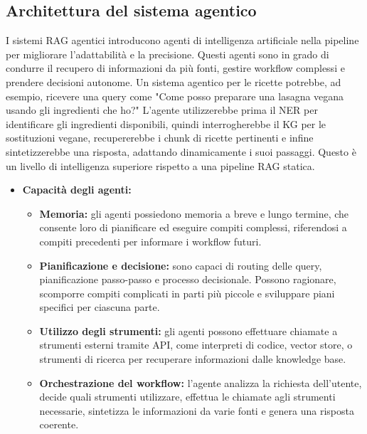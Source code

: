 \documentclass[a4paper, 11pt]{article}
\begin{document}
\subsection{Architettura del sistema agentico}
I sistemi RAG agentici introducono agenti di intelligenza artificiale nella pipeline per migliorare l'adattabilità e la precisione. \cite{what_is_agentic_rag_ibm} Questi agenti sono in grado di condurre il recupero di informazioni da più fonti, gestire workflow complessi e prendere decisioni autonome. Un sistema agentico per le ricette potrebbe, ad esempio, ricevere una query come "Come posso preparare una lasagna vegana usando gli ingredienti che ho?" L'agente utilizzerebbe prima il NER per identificare gli ingredienti disponibili, quindi interrogherebbe il KG per le sostituzioni vegane, recupererebbe i chunk di ricette pertinenti e infine sintetizzerebbe una risposta, adattando dinamicamente i suoi passaggi. Questo è un livello di intelligenza superiore rispetto a una pipeline RAG statica.
\begin{itemize}
    \item \textbf{Capacità degli agenti:}
    \begin{itemize}
        \item \textbf{Memoria:} gli agenti possiedono memoria a breve e lungo termine, che consente loro di pianificare ed eseguire compiti complessi, riferendosi a compiti precedenti per informare i workflow futuri. \cite{what_is_agentic_rag_ibm}
        \item \textbf{Pianificazione e decisione:} sono capaci di routing delle query, pianificazione passo-passo e processo decisionale. \cite{what_is_agentic_rag_ibm} Possono ragionare, scomporre compiti complicati in parti più piccole e sviluppare piani specifici per ciascuna parte. \cite{llm_agents_guide}
        \item \textbf{Utilizzo degli strumenti:} gli agenti possono effettuare chiamate a strumenti esterni tramite API, come interpreti di codice, vector store, o strumenti di ricerca per recuperare informazioni dalle knowledge base. \cite{what_is_agentic_rag_ibm}
        \item \textbf{Orchestrazione del workflow:} l'agente analizza la richiesta dell'utente, decide quali strumenti utilizzare, effettua le chiamate agli strumenti necessarie, sintetizza le informazioni da varie fonti e genera una risposta coerente. \cite{agentic_rag_workflow}
    \end{itemize}
\end{itemize}
\end{document}
